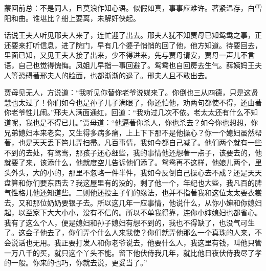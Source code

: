 \begin{parag}
    \begin{note}蒙回前总：不是同人，且莫浪作知心语。似假如真，事事应难许。著紧温存，白雪阳和曲。谁堪比？船上要离，未解奸侠起。\end{note}
\end{parag}


\begin{parag}
    话说王夫人听见邢夫人来了，连忙迎了出去。邢夫人犹不知贾母已知鸳鸯之事，正还要来打听信息，进了院门，早有几个婆子悄悄的回了他，他方知道。待要回去，里面已知，又见王夫人接了出来，少不得进来，先与贾母请安，贾母一声儿不言语，自己也觉得愧悔。凤姐儿早指一事回避了。鸳鸯也自回房去生气。薛姨妈王夫人等恐碍著邢夫人的脸面，也都渐渐的退了。邢夫人且不敢出去。
\end{parag}


\begin{parag}
    贾母见无人，方说道：“我听见你替你老爷说媒来了。你倒也三从四德，只是这贤慧也太过了！你们如今也是孙子儿子满眼了，你还怕他，劝两句都使不得，还由著你老爷性儿闹。”邢夫人满面通红，回道：“我劝过几次不依。老太太还有什么不知道呢，我也是不得已儿。”贾母道：“他逼著你杀人，你也杀去？如今你也想想，你兄弟媳妇本来老实，又生得多病多痛，上上下下那不是他操心？你一个媳妇虽然帮著，也是天天丢下笆儿弄扫帚。凡百事情，我如今都自己减了。他们两个就有一些不到的去处，有鸳鸯，那孩子还心细些，我的事情他还想著一点子，该要去的，他就要了来，该添什么，他就度空儿告诉他们添了。鸳鸯再不这样，他娘儿两个，里头外头，大的小的，那里不忽略一件半件，我如今反倒自己操心去不成？还是天天盘算和你们要东西去？我这屋里有的没的，剩了他一个，年纪也大些，我凡百的脾气性格儿他还知道些。二则他还投主子们的缘法，也并不指著我和这位太太要衣裳去，又和那位奶奶要银子去。所以这几年一应事情，他说什么，从你小婶和你媳妇起，以至家下大大小小，没有不信的。所以不单我得靠，连你小婶媳妇也都省心。我有了这么个人，便是媳妇和孙子媳妇有想不到的，我也不得缺了，也没气可生了。这会子他去了，你们弄个什么人来我使？你们就弄他那么一个真珠的人来，不会说话也无用。我正要打发人和你老爷说去，他要什么人，我这里有钱，叫他只管一万八千的买，就只这个丫头不能。留下他伏侍我几年，就比他日夜伏侍我尽了孝的一般。你来的也巧，你就去说，更妥当了。”
\end{parag}


